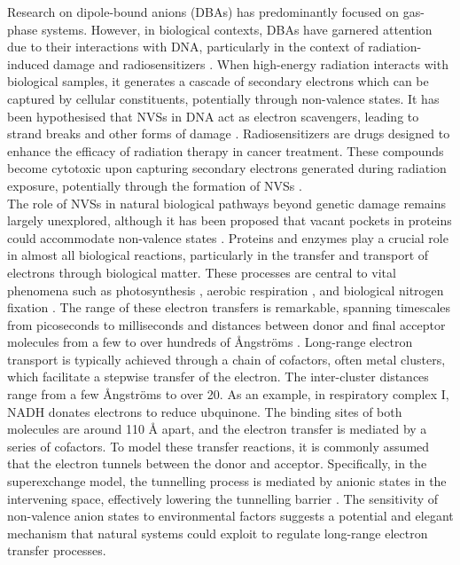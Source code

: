 Research on dipole-bound anions (DBAs) has predominantly focused on gas-phase systems. However, in biological contexts, DBAs have garnered attention due to their interactions with DNA, particularly in the context of radiation-induced damage and radiosensitizers \cite{gu2012interactions,narayanan2023secondary,sedmidubska2024interaction}.
When high-energy radiation interacts with biological samples, it generates a cascade of secondary electrons which can be captured by cellular constituents, potentially through non-valence states. It has been hypothesised that NVSs in DNA act as electron scavengers, leading to strand breaks and other forms of damage \cite{gu2012interactions,narayanan2023secondary,narayanan2024electron,sommerfeld2005dipole}.
Radiosensitizers are drugs designed to enhance the efficacy of radiation therapy in cancer treatment. These compounds become cytotoxic upon capturing secondary electrons generated during radiation exposure, potentially through the formation of NVSs \cite{sedmidubska2024interaction}.\\

The role of NVSs in natural biological pathways beyond genetic damage remains largely unexplored, although it has been proposed that vacant pockets in proteins could accommodate non-valence states \cite{castellani2019stability}. Proteins and enzymes play a crucial role in almost all biological reactions, particularly in the transfer and transport of electrons through biological matter. These processes are central to vital phenomena such as photosynthesis \cite{mitchell1961coupling}, aerobic respiration \cite{wikstrom1977proton}, and biological nitrogen fixation \cite{rutledge2020electron}. The range of these electron transfers is remarkable, spanning timescales from picoseconds to milliseconds and distances between donor and final acceptor molecules from a few to over hundreds of \r{A}ngstr{\"o}ms \cite{gray1996electron,blumberger2015recent}. Long-range electron transport is typically achieved through a chain of cofactors, often metal clusters, which facilitate a stepwise transfer of the electron. The inter-cluster distances range from a few \r{A}ngstr{\"o}ms to over 20. As an example, in respiratory complex I, NADH donates electrons to reduce ubquinone\cite{ernster1995biochemical}. The binding sites of both molecules are around 110 \r{A} apart, and the electron transfer is mediated by a series of cofactors. To model these transfer reactions, it is commonly assumed that the electron tunnels between the donor and acceptor. Specifically, in the superexchange model, the tunnelling process is mediated by anionic states in the intervening space, effectively lowering the tunnelling barrier \cite{blumberger2015recent}. The sensitivity of non-valence anion states to environmental factors suggests a potential and elegant mechanism that natural systems could exploit to regulate long-range electron transfer processes.\\ %

